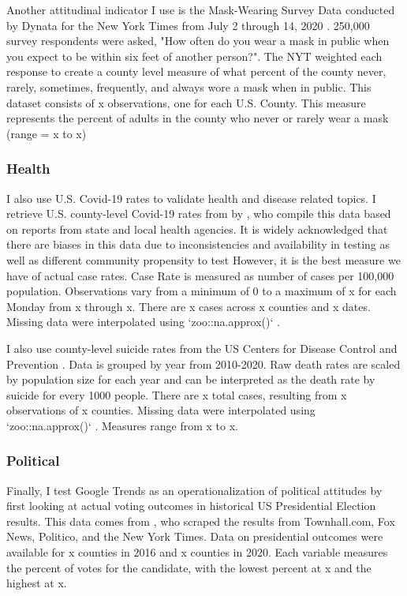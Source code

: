 Another attitudinal indicator I use is the Mask-Wearing Survey Data conducted by
Dynata for the New York Times from July 2 through 14, 2020 \citep{mask_data}. 250,000
survey respondents were asked, "How often do you wear a mask in public when you
expect to be within six feet of another person?". The NYT weighted each response
to create a county level measure of what percent of the county never, rarely,
sometimes, frequently, and always wore a mask when in public. This dataset
consists of x observations, one for each U.S. County. This measure
represents the percent of adults in the county who never or rarely wear a mask
(range = x to x)

\subsubsection{Health}


I also use U.S. Covid-19 rates to validate health and disease related topics. I
retrieve U.S. county-level Covid-19 rates from by \citet{covid_data}, who compile this
data based on reports from state and local health agencies. It is widely
acknowledged that there are biases in this data due to inconsistencies and
availability in testing as well as different community propensity to test
\citep{gu22, cdc20a} However, it is the best measure we have of actual case rates.
Case Rate is measured as number of cases per 100,000 population. Observations
vary from a minimum of 0 to a maximum of x for each 
Monday from x through x. There are x cases across x counties and x dates. Missing data were interpolated using `zoo::na.approx()` \citep{zoo}.

I also use county-level suicide rates from the US Centers for Disease Control
and Prevention \citeyearpar{suic_data}. Data is grouped by year from 2010-2020. Raw death
rates are scaled by population size for each year and can be interpreted as the
death rate by suicide for every 1000 people. There are x total
cases, resulting from x observations of x counties. Missing data were interpolated using
`zoo::na.approx()` \citep{zoo}. Measures range from x to x.

\subsubsection{Political}

Finally, I test Google Trends as an operationalization of political
attitudes by first looking at actual voting outcomes in historical US
Presidential Election results. This data comes from  \citet{pres_data}, who scraped the
results from Townhall.com, Fox News, Politico, and the New York Times. Data on 
presidential outcomes were available for x counties in 2016 and
x counties in 2020. Each variable measures the percent of votes
for the candidate, with the lowest percent at x and the highest at x. 

